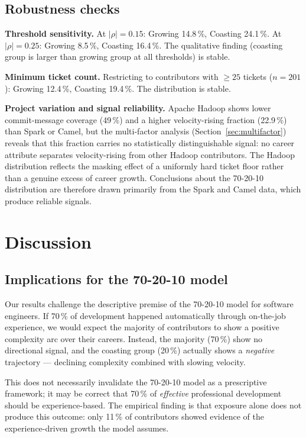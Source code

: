 \documentclass[12pt,a4paper]{article}
\begin{document}
\subsection{Robustness checks}
\label{sec:robustness}

\textbf{Threshold sensitivity.}
At $|\rho| = 0.15$: Growing 14.8\,\%, Coasting 24.1\,\%.
At $|\rho| = 0.25$: Growing 8.5\,\%, Coasting 16.4\,\%.
The qualitative finding (coasting group is larger than growing group
at all thresholds) is stable.

\textbf{Minimum ticket count.}
Restricting to contributors with $\geq25$ tickets ($n=201$):
Growing 12.4\,\%, Coasting 19.4\,\%.
The distribution is stable.

\textbf{Project variation and signal reliability.}
Apache Hadoop shows lower commit-message coverage (49\,\%) and a
higher velocity-rising fraction (22.9\,\%) than Spark or Camel,
but the multi-factor analysis (Section~\ref{sec:multifactor}) reveals
that this fraction carries no statistically distinguishable signal:
no career attribute separates velocity-rising from other Hadoop
contributors.
The Hadoop distribution reflects the masking effect of a uniformly
hard ticket floor rather than a genuine excess of career growth.
Conclusions about the 70-20-10 distribution are therefore drawn
primarily from the Spark and Camel data, which produce reliable signals.

\section{Discussion}

\subsection{Implications for the 70-20-10 model}

Our results challenge the descriptive premise of the 70-20-10 model
for software engineers.
If 70\,\% of development happened automatically through on-the-job
experience, we would expect the majority of contributors to show
a positive complexity arc over their careers.
Instead, the majority (70\,\%) show no directional signal, and the
coasting group (20\,\%) actually shows a \textit{negative} trajectory
--- declining complexity combined with slowing velocity.

This does not necessarily invalidate the 70-20-10 model as a
prescriptive framework; it may be correct that 70\,\% of
\textit{effective} professional development should be experience-based.
The empirical finding is that exposure alone does not produce this
outcome: only 11\,\% of contributors showed evidence of the
experience-driven growth the model assumes.
\end{document}
